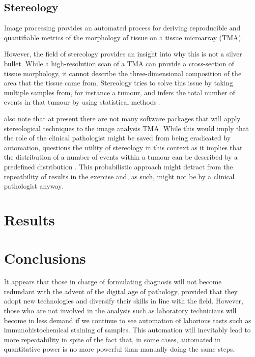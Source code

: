 \documentclass[12pt]{article}
\begin{document}
\subsection{Stereology}
Image processing provides an automated process for deriving reproducible and quantifiable metrics of the 
morphology of tissue on a tissue microarray (TMA).

However, the field of stereology provides an insight into why this is not a silver bullet. While a high-resolution 
scan of a TMA can provide a cross-section of tissue morphology, it cannot describe the three-dimensional 
composition of the area that the tissue came from. Stereology tries to solve this issue by taking multiple samples 
from, for instance a tumour, and infers the total number of events in that tumour by using statistical methods 
\parencite{webster2014whole}.

\citeauthor{webster2014whole} also note that at present there are not many software packages that will apply 
stereological techniques to the image analysis TMA. While this would imply that the role of the clinical pathologist 
might be saved from being eradicated by automation, \citeauthor{suvarna2013bancroft} questions the utility of 
stereology in this context as it implies that the distribution of a number of events within a tumour can be described 
by a predefined distribution \parencite[p.~540, Ch.~23.]{suvarna2013bancroft}. This probabilistic approach might 
detract from the repeatbility of results in the exercise and, as such, might not be by a clinical pathologist anyway.

\section{Results}\label{results}

\section{Conclusions}\label{conclusions}

It appears that those in charge of formulating diagnosis will not become redundant with the advent of the digital age 
of pathology, provided that they adopt new technologies and diversify their skills in line with the field. However, those 
who are not involved in the analysis such as laboratory technicians will become in less demand if we continue to see 
automation of laborious tasts such as immunohistochemical staining of samples. This automation will inevitably lead to 
more repeatability in spite of the fact that, in some cases, automated in quantitative power is no more powerful than 
manually doing the same steps.
\end{document}
